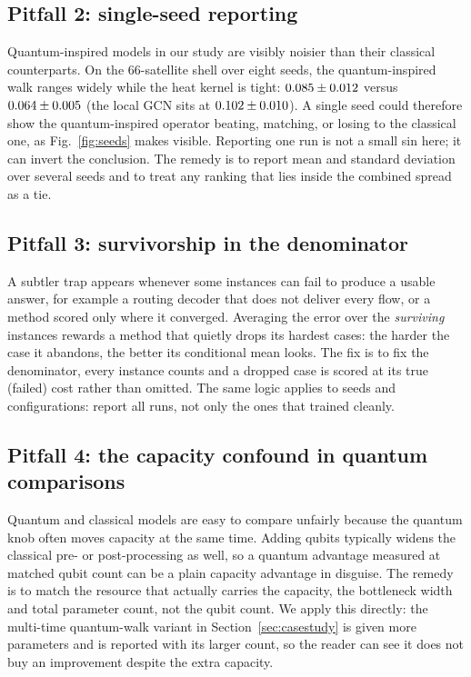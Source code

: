 

\subsection{Pitfall 2: single-seed reporting}
Quantum-inspired models in our study are visibly noisier than their classical
counterparts. On the $66$-satellite shell over eight seeds, the quantum-inspired walk
ranges widely while the heat kernel is tight: $0.085\pm0.012$ versus
$0.064\pm0.005$ (the local GCN sits at $0.102\pm0.010$). A single
seed could therefore show the quantum-inspired operator beating, matching, or losing
to the classical one, as Fig.~\ref{fig:seeds} makes visible. Reporting one run is not a
small sin here; it can invert the conclusion. The remedy is to report mean and standard
deviation over several seeds and to treat any ranking that lies inside the combined
spread as a tie.



\subsection{Pitfall 3: survivorship in the denominator}
A subtler trap appears whenever some instances can fail to produce a usable answer, for
example a routing decoder that does not deliver every flow, or a method scored only where
it converged. Averaging the error over the \emph{surviving} instances rewards a method
that quietly drops its hardest cases: the harder the case it abandons, the better its
conditional mean looks. The fix is to fix the denominator, every instance counts and a
dropped case is scored at its true (failed) cost rather than omitted. The same logic
applies to seeds and configurations: report all runs, not only the ones that trained
cleanly.

\subsection{Pitfall 4: the capacity confound in quantum comparisons}
Quantum and classical models are easy to compare unfairly because the quantum knob often
moves capacity at the same time. Adding qubits typically widens the classical pre- or
post-processing as well, so a quantum advantage measured at matched qubit count can be a
plain capacity advantage in disguise. The remedy is to match the resource that actually
carries the capacity, the bottleneck width and total parameter count, not the qubit
count. We apply this directly: the multi-time quantum-walk variant in
Section~\ref{sec:casestudy} is given more parameters and is reported with its larger
count, so the reader can see it does not buy an improvement despite the extra capacity.


